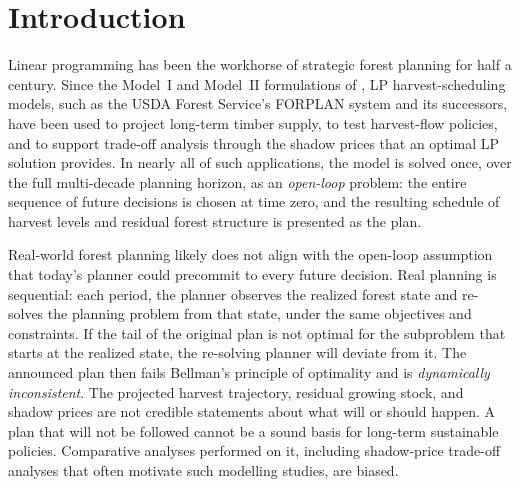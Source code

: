 \section{Introduction}

Linear programming has been the workhorse of strategic forest planning for half a century. Since the Model~I and Model~II formulations of \citet{johnson1977techniques}, LP harvest-scheduling models, such as the USDA Forest Service's FORPLAN system and its successors, have been used to project long-term timber supply, to test harvest-flow policies, and to support trade-off analysis through the shadow prices that an optimal LP solution provides. In nearly all of such applications, the model is solved once, over the full multi-decade planning horizon, as an \emph{open-loop} problem: the entire sequence of future decisions is chosen at time zero, and the resulting schedule of harvest levels and residual forest structure is presented as the plan.

Real-world forest planning likely does not align with the open-loop assumption that today's planner could precommit to every future decision. Real planning is sequential: each period, the planner observes the realized forest state and re-solves the planning problem from that state, under the same objectives and constraints. If the tail of the original plan is not optimal for the subproblem that starts at the realized state, the re-solving planner will deviate from it. The announced plan then fails Bellman's principle of optimality \citep{bellman1957dynamic} and is \emph{dynamically inconsistent}. The projected harvest trajectory, residual growing stock, and shadow prices are not credible statements about what will or should happen. A plan that will not be followed cannot be a sound basis for long-term sustainable policies. Comparative analyses performed on it, including shadow-price trade-off analyses that often motivate such modelling studies, are biased.

